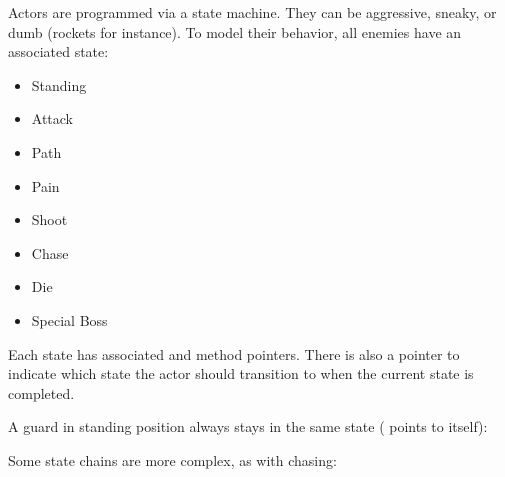 Actors are programmed via a state machine. They can be aggressive, sneaky, or dumb (rockets for instance). To model their behavior, all enemies have an associated state:
\begin{itemize}
\item Standing
\item Attack
\item Path
\item Pain
\item Shoot
\item Chase
\item Die
\item Special Boss
\end{itemize}

Each state has associated  and  method pointers. There is also a  pointer to indicate which state the actor should transition to when the current state is completed.\\
\par
\begin{minipage}{\textwidth}

\end{minipage}
\par


A guard in standing position always stays in the same state ( points to itself):\\
\par

\begin{minipage}{\textwidth}

\end{minipage}
\par
Some state chains are more complex, as with chasing:\\

\par
\begin{minipage}{\textwidth}

\end{minipage}
\par

